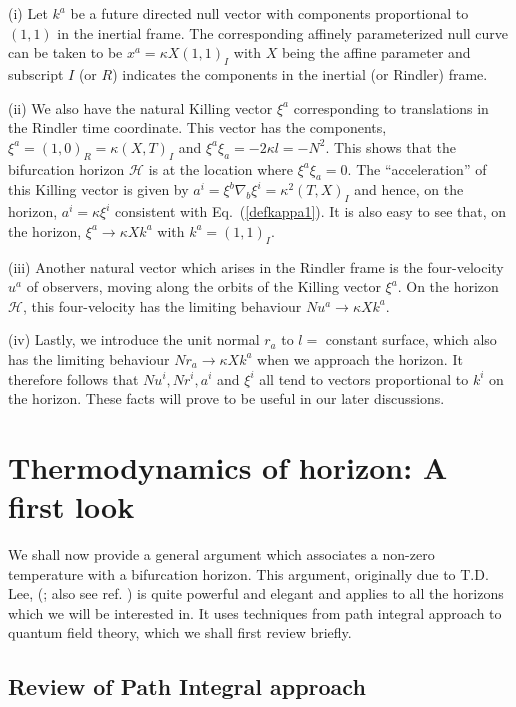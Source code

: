 \documentclass[12pt]{iopart}
\def\eq#1{{Eq.~(\ref{#1})}}
\begin{document}
(i) Let $k^a$ be a future directed null vector with components proportional to $(1,1)$
in the inertial frame.  The corresponding  affinely parameterized null curve can be taken
to be $x^a = \kappa X(1,1)_I$ with $X$ being the affine parameter and subscript $I$ (or $R$)
indicates the components in the inertial (or Rindler) frame. 


(ii) We also have the natural   Killing vector $\xi^a$ corresponding to translations in the 
Rindler time coordinate. This vector has the components, 
$ \xi^a  = (1,0)_R = \kappa (X,T)_I $ and $ \xi^a \xi_a= -2\kappa l =-N^2$.
This shows that the bifurcation horizon $\mathcal{H}$ is at the location where $\xi^a\xi_a=0$.
The ``acceleration'' of this Killing vector is given by 
$a^i = \xi^b \nabla_b \xi^i = \kappa^2 (T,X)_I $ 
and hence, on the horizon, $a^i = \kappa \xi^i $ consistent with \eq{defkappa1}. 
It is also easy to see that, on the horizon, $\xi^a \to \kappa X k^a$ with $k^a = (1,1)_I$.


(iii) Another natural vector which arises in the Rindler frame is the  four-velocity $u^a$ of observers, moving along the orbits of the Killing vector 
$\xi^a $.  On the horizon $\mathcal{H}$,
this four-velocity has the limiting behaviour
$N u^a \to \kappa Xk^a$.

(iv) Lastly, we introduce  the unit normal $r_a$ to $l=$ constant surface, 
which also has the limiting behaviour
$Nr_a\to \kappa X k^a$
when we approach the horizon. 
It therefore follows that 
  $Nu^i, Nr^i, a^i$ and $\xi^i$
all tend to vectors proportional to $k^i$ on the horizon.
These  facts will prove to be useful   in our later discussions.
  
  
  \section{Thermodynamics of horizon: A first look}\label{sec:thermofirst}
  
  We shall now provide a general argument which associates a non-zero temperature with a bifurcation horizon. This argument, originally due to T.D. Lee, (\cite{lee}; also see ref. \cite{Unruh:1983ac}) is quite powerful and elegant and applies to all the horizons which we will be interested in. It uses techniques from path integral approach to quantum field theory, which we shall first review briefly.
  
\subsection{Review of Path Integral approach}\label{sec:pireview}  
\end{document}
